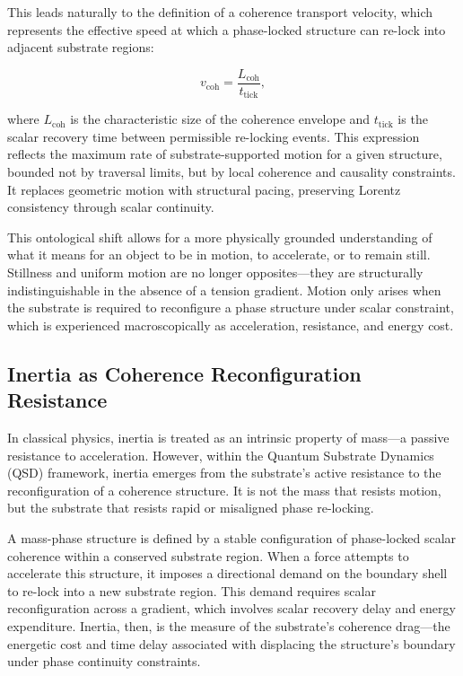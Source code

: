 \documentclass[entropy,article,submit,pdftex,moreauthors]{Definitions/mdpi}
\begin{document}
This leads naturally to the definition of a coherence transport velocity, which represents the effective speed at which a phase-locked structure can re-lock into adjacent substrate regions:

\begin{equation}
    v_{\text{coh}} = \frac{L_{\text{coh}}}{t_{\text{tick}}},
\end{equation}

where \( L_{\text{coh}} \) is the characteristic size of the coherence envelope and \( t_{\text{tick}} \) is the scalar recovery time between permissible re-locking events. This expression reflects the maximum rate of substrate-supported motion for a given structure, bounded not by traversal limits, but by local coherence and causality constraints. It replaces geometric motion with structural pacing, preserving Lorentz consistency through scalar continuity.

This ontological shift allows for a more physically grounded understanding of what it means for an object to be in motion, to accelerate, or to remain still. Stillness and uniform motion are no longer opposites—they are structurally indistinguishable in the absence of a tension gradient. Motion only arises when the substrate is required to reconfigure a phase structure under scalar constraint, which is experienced macroscopically as acceleration, resistance, and energy cost.
\subsection{Inertia as Coherence Reconfiguration Resistance}

In classical physics, inertia is treated as an intrinsic property of mass---a passive resistance to acceleration. However, within the Quantum Substrate Dynamics (QSD) framework, inertia emerges from the substrate’s active resistance to the reconfiguration of a coherence structure. It is not the mass that resists motion, but the substrate that resists rapid or misaligned phase re-locking.

A mass-phase structure is defined by a stable configuration of phase-locked scalar coherence within a conserved substrate region. When a force attempts to accelerate this structure, it imposes a directional demand on the boundary shell to re-lock into a new substrate region. This demand requires scalar reconfiguration across a gradient, which involves scalar recovery delay and energy expenditure. Inertia, then, is the measure of the substrate’s coherence drag---the energetic cost and time delay associated with displacing the structure’s boundary under phase continuity constraints.
\end{document}

